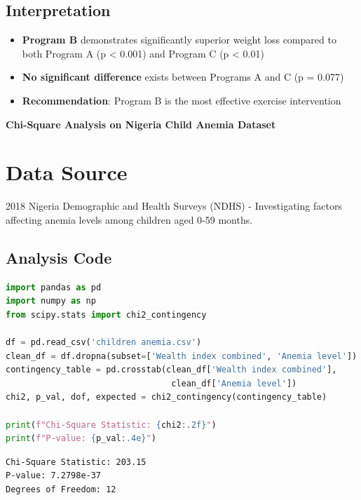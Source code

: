 \documentclass[12pt, a4paper]{article}
\newcounter{problemcounter}
\newcommand{\problemtitle}[1]{%
    \vspace{1cm}
    \begin{tcolorbox}[
        colback=DeepForest!5,
        colframe=DeepForest,
        arc=15pt,
        boxrule=1.2pt,
        left=20pt,
        right=20pt,
        top=12pt,
        bottom=12pt,
        enhanced,
        attach boxed title to top center={yshift=-8pt},
        boxed title style={
            colback=AmberSunset,
            colframe=DeepForest,
            arc=10pt,
            outer arc=10pt,
            boxrule=0.8pt,
            sharp corners,
            },
        title={\color{white}\large\sffamily\bfseries \faTasks \quad PROBLEM \arabic{problemcounter}}
    ]
        \centering
        {\color{DeepForest}\Large\bfseries\sffamily #1}
    \end{tcolorbox}
    \stepcounter{problemcounter}
    \vspace{0.3cm}
}
\begin{document}
\subsection*{Interpretation}

\begin{itemize}
    \item \textbf{Program B} demonstrates significantly superior weight loss compared to both Program A (p < 0.001) and Program C (p < 0.01)
    \item \textbf{No significant difference} exists between Programs A and C (p = 0.077)
    \item \textbf{Recommendation}: Program B is the most effective exercise intervention
\end{itemize}

\newpage

\problemtitle{Chi-Square Analysis on Nigeria Child Anemia Dataset}

\section*{Data Source}
2018 Nigeria Demographic and Health Surveys (NDHS) - Investigating factors affecting anemia levels among children aged 0-59 months.

\subsection*{Analysis Code}

\begin{lstlisting}[language=Python]
import pandas as pd
import numpy as np
from scipy.stats import chi2_contingency

df = pd.read_csv('children anemia.csv')
clean_df = df.dropna(subset=['Wealth index combined', 'Anemia level'])
contingency_table = pd.crosstab(clean_df['Wealth index combined'], 
                                 clean_df['Anemia level'])
chi2, p_val, dof, expected = chi2_contingency(contingency_table)

print(f"Chi-Square Statistic: {chi2:.2f}")
print(f"P-value: {p_val:.4e}")
\end{lstlisting}

\begin{outputbox}
\begin{verbatim}
Chi-Square Statistic: 203.15
P-value: 7.2798e-37
Degrees of Freedom: 12
\end{verbatim}
\end{outputbox}
\end{document}
